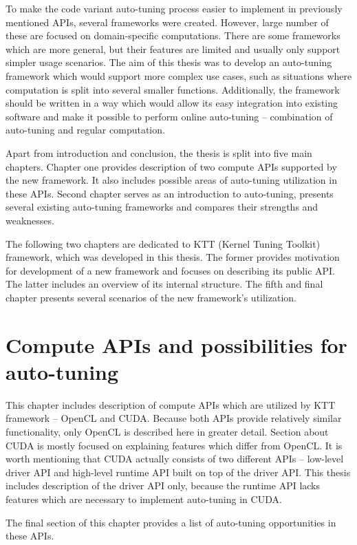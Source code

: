 \documentclass
[
    digital, %
    oneside, %
    table, %
    nolof, %
    nolot, %
    nocover %
]{fithesis3}
\begin{document}
To make the code variant auto-tuning process easier to implement in previously mentioned APIs, several frameworks were created. However, large number of
these are focused on domain-specific computations. There are some frameworks which are more general, but their features are limited and usually only
support simpler usage scenarios. The aim of this thesis was to develop an auto-tuning framework which would support more complex use cases, such as
situations where computation is split into several smaller functions. Additionally, the framework should be written in a way which would allow its easy
integration into existing software and make it possible to perform online auto-tuning -- combination of auto-tuning and regular computation.

Apart from introduction and conclusion, the thesis is split into five main chapters. Chapter one provides description of two compute APIs supported
by the new framework. It also includes possible areas of auto-tuning utilization in these APIs. Second chapter serves as an introduction to auto-tuning,
presents several existing auto-tuning frameworks and compares their strengths and weaknesses.

The following two chapters are dedicated to KTT (Kernel Tuning Toolkit) framework, which was developed in this thesis. The former provides motivation for
development of a new framework and focuses on describing its public API. The latter includes an overview of its internal structure. The fifth and final
chapter presents several scenarios of the new framework's utilization.

\chapter{Compute APIs and possibilities for auto-tuning}
This chapter includes description of compute APIs which are utilized by KTT framework -- OpenCL and CUDA. Because both APIs provide relatively similar
functionality, only OpenCL is described here in greater detail. Section about CUDA is mostly focused on explaining features which differ from OpenCL.
It is worth mentioning that CUDA actually consists of two different APIs -- low-level driver API and high-level runtime API built on top of the driver
API. This thesis includes description of the driver API only, because the runtime API lacks features which are necessary to implement auto-tuning in CUDA.

The final section of this chapter provides a list of auto-tuning opportunities in these APIs.
\end{document}
